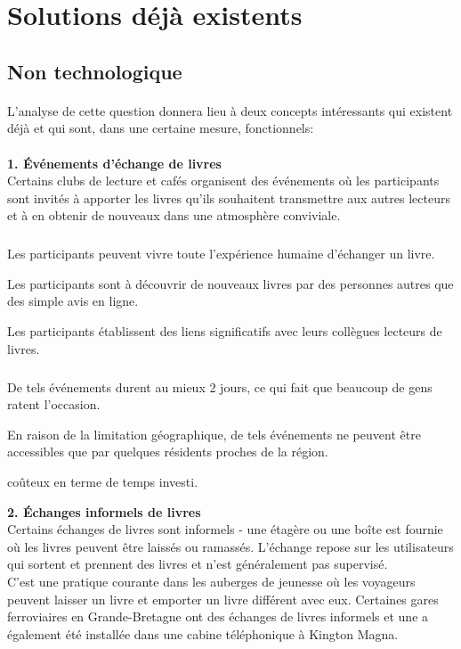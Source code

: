 \section{Solutions déjà existents}

\subsection{Non technologique}

\paragraph*{}
L'analyse de cette question donnera lieu à deux concepts intéressants qui existent déjà et qui sont, dans une certaine mesure, fonctionnels:\\\\
\textbf{1. Événements d'échange de livres}\\
\tab Certains clubs de lecture et cafés organisent des événements où les participants sont invités à apporter les livres qu'ils souhaitent transmettre aux autres lecteurs et à en obtenir de nouveaux dans une atmosphère conviviale.

\subparagraph*{}
\begin{list}{•}{\textbf{Avantages}}
\item Les participants peuvent vivre toute l'expérience humaine d'échanger un livre.
\item Les participants sont à découvrir de nouveaux livres par des personnes autres que des simple avis en ligne.
\item Les participants établissent des liens significatifs avec leurs collègues lecteurs de livres.
\end{list}

\subparagraph*{}
\begin{list}{•}{\textbf{Inconvénients}}
\item De tels événements durent au mieux 2 jours, ce qui fait que beaucoup de gens ratent l'occasion.
\item En raison de la limitation géographique, de tels événements ne peuvent être accessibles que par quelques résidents proches de la région.
\item coûteux en terme de temps investi.\\
\end{list}

\textbf{2. Échanges informels de livres}\\
\tab Certains échanges de livres sont informels - une étagère ou une boîte est fournie où les livres peuvent être laissés ou ramassés. L'échange repose sur les utilisateurs qui sortent et prennent des livres et n'est généralement pas supervisé.\\
\tab C'est une pratique courante dans les auberges de jeunesse où les voyageurs peuvent laisser un livre et emporter un livre différent avec eux. Certaines gares ferroviaires en Grande-Bretagne ont des échanges de livres informels et une a également été installée dans une cabine téléphonique à Kington Magna.

